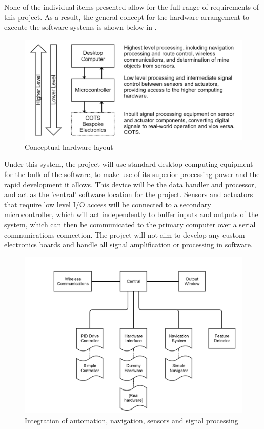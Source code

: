 \documentclass[main.tex]{subfiles}
\begin{document}
None of the individual items presented allow for the full range of requirements of this project. As a result, the general concept for the hardware arrangement to execute the software systems is shown below in .
\begin{figure}[ht]
\includegraphics[width = \textwidth]{3-ConceptDesign/electronics.png}
\centering
\caption{Conceptual hardware layout} 
\end{figure}

Under this system, the project will use standard desktop computing equipment for the bulk of the software, to make use of its superior processing power and the rapid development it allows. This device will be the data handler and processor, and act as the 'central' software location for the project. Sensors and actuators that require low level I/O access will be connected to a secondary microcontroller, which will act independently to buffer inputs and outputs of the system, which can then be communicated to the primary computer over a serial communications connection. The project will not aim to develop any custom electronics boards and handle all signal amplification or processing in software.

\begin{figure}[ht]
\includegraphics[width=\textwidth]{3-ConceptDesign/fyp_structure.png}
\centering
\caption{Integration of automation, navigation, sensors and signal processing} 
\end{figure}
\end{document}
